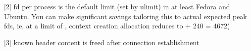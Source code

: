 \mbox{[}2\mbox{]} {} fd per process is the default limit (set by ulimit) in at least Fedora and Ubuntu. You can make significant savings tailoring this to actual expected peak fds, ie, at a limit of {}, context creation allocation reduces to { + 240 = 4672})

\mbox{[}3\mbox{]} known header content is freed after connection establishment 